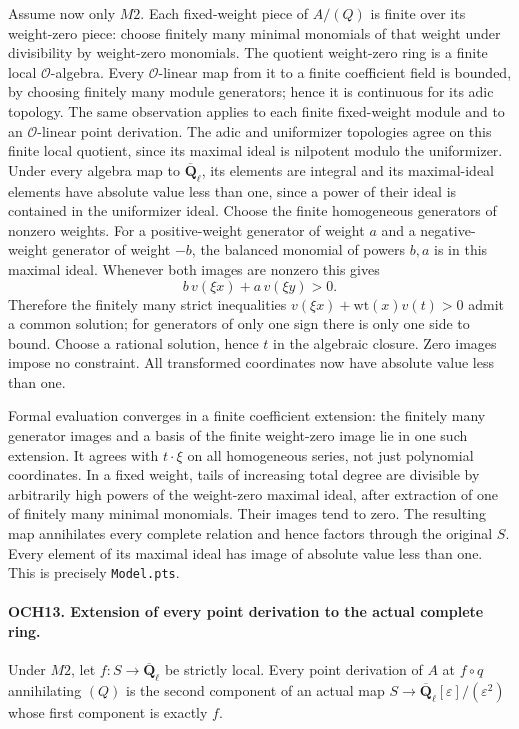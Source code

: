\documentclass[11pt,a4paper]{article}
\numberwithin{equation}{section}
\theoremstyle{remark}\newtheorem{remark}[theorem]{Remark}
\begin{document}
Assume now only \(M2\).  Each fixed-weight piece of \(A/(Q)\)
is finite over its weight-zero piece: choose finitely many minimal
monomials of that weight under divisibility by weight-zero monomials.
The quotient weight-zero ring is a finite local
\(\mathcal O\)-algebra.  Every \(\mathcal O\)-linear map
from it to a finite coefficient field is bounded, by choosing finitely
many module generators; hence it is continuous for its adic topology.
The same observation applies to each finite fixed-weight module and
to an \(\mathcal O\)-linear point derivation.  The adic and
uniformizer topologies agree on this finite local quotient, since
its maximal ideal is nilpotent modulo the uniformizer.
Under every algebra map to
\(\overline{\mathbf Q}_\ell\), its elements are integral and
its maximal-ideal elements have absolute value less than one,
since a power of their ideal is contained in the uniformizer ideal.
Choose the finite homogeneous generators of nonzero weights.
For a positive-weight generator of weight \(a\) and a
negative-weight generator of weight \(-b\), the balanced
monomial of powers \(b,a\) is in this maximal ideal.  Whenever
both images are nonzero this gives
\[
              b\,v(\xi x)+a\,v(\xi y)>0.
\]
Therefore the finitely many strict inequalities
\(v(\xi x)+\mathrm{wt}(x)v(t)>0\) admit a common solution;
for generators of only one sign there is only one side to bound.
Choose a rational solution, hence \(t\) in the algebraic closure.
Zero images impose no constraint.  All transformed coordinates now
have absolute value less than one.

Formal evaluation converges in a finite coefficient extension:
the finitely many generator images and a basis of the finite
weight-zero image lie in one such extension.  It agrees with
\(t\cdot\xi\) on all homogeneous series, not just polynomial
coordinates.  In a fixed weight, tails of increasing total degree
are divisible by arbitrarily high powers of the weight-zero maximal
ideal, after extraction of one of finitely many minimal monomials.
Their images tend to zero.  The resulting map annihilates every
complete relation and hence factors through the original \(S\).
Every element of its maximal ideal has image of absolute value
less than one.  This is precisely \texttt{Model.\allowbreak pts}.

\paragraph{OCH13. Extension of every point derivation to the actual complete ring.}
\label{claim:OCH13}
Under \(M2\), let \(f:S\to\overline{\mathbf Q}_\ell\)
be strictly local.  Every point derivation of \(A\) at
\(f\circ q\) annihilating \((Q)\) is the second component
of an actual map
\(S\to\overline{\mathbf Q}_\ell[\varepsilon]/(\varepsilon^2)\)
whose first component is exactly \(f\).
\end{document}
